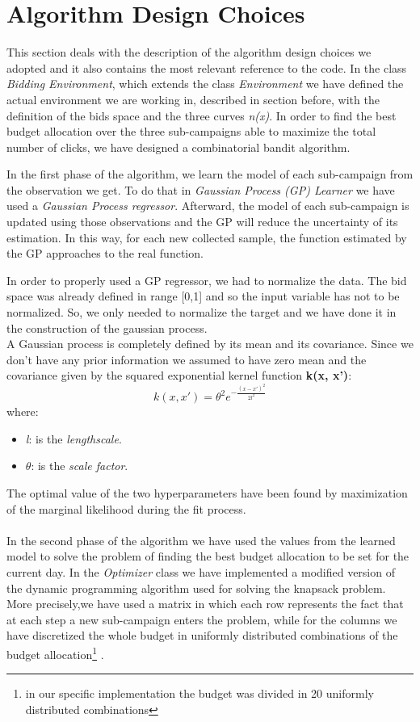 \section{Algorithm Design Choices}

This section deals with the description of the algorithm design choices we adopted and
it also contains the most relevant reference to the code.
In the class \textit{Bidding Environment}, which extends the class \textit{Environment} we have defined the actual environment we are working in, described in section before, with the definition of the bids space and the three curves \textit{n(x)}.
In order to find the best budget allocation over the three sub-campaigns able to maximize the total number of clicks, we have designed a combinatorial bandit algorithm.

In the first phase of the algorithm, we learn the model of each sub-campaign from the observation we get.
To do that in \textit{Gaussian Process (GP) Learner} we have used a \textit{Gaussian Process regressor}.
Afterward, the model of each sub-campaign is updated using those observations and the GP will reduce the uncertainty of its estimation.
In this way, for each new collected sample, the function estimated by the GP approaches to the real function.


In order to properly used a GP regressor, we had to normalize the data. The bid space was already defined in range [0,1] and so the input variable has not to be normalized. So, we only needed to normalize the target and we have done it in the construction of the gaussian process.\\
A Gaussian process is completely defined by its mean and its covariance. Since we don't have any prior information we assumed to have zero mean and the covariance given by the squared exponential kernel function \textbf{k(x, x')}:
\begin{equation}
	k(x,x') = \theta^{2} e^{-\frac{(x-x')^2}{2 l^2}}
\end{equation}
where:
\begin{itemize}
	\item \textit{l}: is the \textit{lengthscale}.
	\item $\theta$: is the \textit{scale factor}.
\end{itemize}
The optimal value of the two hyperparameters have been found by maximization of the marginal likelihood during the fit process.
\\
\\
In the second phase of the algorithm we have used the values from the learned model to solve the problem of finding the best budget allocation to be set for the current day.
In the \textit{Optimizer} class we have implemented a modified version of the dynamic programming algorithm used for solving the knapsack problem.
More precisely,we have used a matrix in which each row represents the fact that at each step a new sub-campaign enters the problem, while for the columns we have discretized the whole budget in uniformly distributed combinations of the budget allocation\footnote{in our specific implementation the budget was divided in 20 uniformly distributed combinations} .

